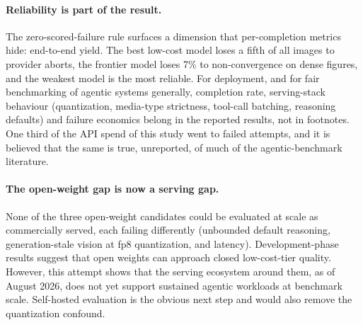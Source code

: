 \documentclass{article}
\begin{document}
\paragraph{Reliability is part of the result.} The zero-scored-failure
rule surfaces a dimension that per-completion metrics hide: end-to-end
yield. The best low-cost model loses a fifth of all images to provider
aborts, the frontier model loses 7\% to non-convergence on dense
figures, and the weakest model is the most reliable. For deployment,
and for fair benchmarking of agentic systems generally, completion
rate, serving-stack behaviour (quantization, media-type strictness,
tool-call batching, reasoning defaults) and failure economics belong
in the reported results, not in footnotes. One third of the API spend
of this study went to failed attempts, and it is believed that the
same is true, unreported, of much of the agentic-benchmark
literature.

\paragraph{The open-weight gap is now a serving gap.} None of the three
open-weight candidates could be evaluated at scale as commercially
served, each failing differently (unbounded default reasoning,
generation-stale vision at fp8 quantization, and latency). Development-phase
results suggest that open weights can approach closed low-cost-tier
quality. However, this attempt shows that the serving ecosystem around
them, as of August 2026, does not yet support sustained agentic
workloads at benchmark scale. Self-hosted evaluation is the obvious next step and
would also remove the quantization confound.
\end{document}
